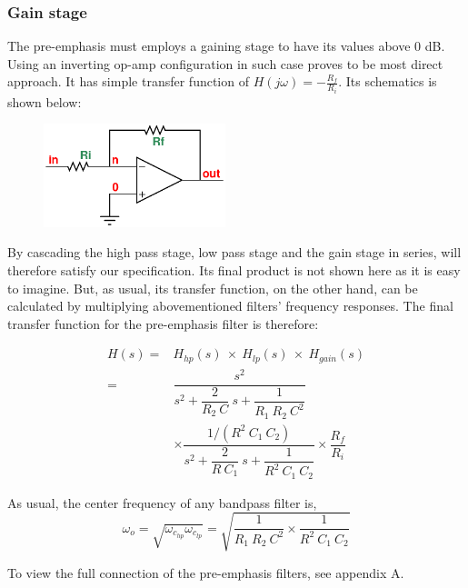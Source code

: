 \documentclass[report]{IEEEtran}
\newcommand{\inv}[1]{\dfrac{1}{#1}}
\begin{document}
			\subsubsection{Gain stage}
				The pre-emphasis must employs a gaining stage to have its values above 0 dB. Using an inverting op-amp configuration in such case proves to be most direct approach. It has simple transfer function of $H(j\omega) = -\tfrac{R_f}{R_i}$. Its schematics is shown below:
				\begin{figure}[h!]
					\begin{center}
						\includegraphics[width=200px]{gain.eps}
					\end{center}
				\end{figure}
			
			By cascading the high pass stage, low pass stage and the gain stage in series, will therefore satisfy our specification. Its final product is not shown here as it is easy to imagine. But, as usual, its transfer function, on the other hand, can be calculated by multiplying abovementioned filters' frequency responses. The final transfer function for the pre-emphasis filter is therefore:
			
			\begin{align}
				H(s) = & H_{hp}(s)~\times~H_{lp}(s)~\times~H_{gain}(s) \\
				= & \dfrac{s^2}{s^2+\dfrac{2}{R_2~C}~s+\inv{R_1~R_2~C^2}} \\ & \times \dfrac{1/(R^2~C_1~C_2)}{s^2+\dfrac{2}{R~C_1}~s+\inv{R^2~C_1~C_2}} \times \dfrac{R_f}{R_i}
			\end{align}
			
			As usual, the center frequency of any bandpass filter is,
			\begin{equation}
				\omega_o = \sqrt{\omega_{c_{hp}} \omega_{c_{lp}}} = \sqrt{\inv{R_1~R_2~C^2} \times \inv{R^2~C_1~C_2}}
			\end{equation}
			
			To view the full connection of the pre-emphasis filters, see appendix A.
		
\end{document}
